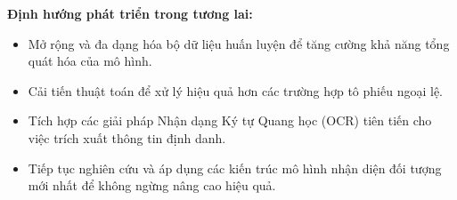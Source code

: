 \textbf{Định hướng phát triển trong tương lai:}
\begin{itemize}
    \item Mở rộng và đa dạng hóa bộ dữ liệu huấn luyện để tăng cường khả năng tổng quát hóa của mô hình.
    \item Cải tiến thuật toán để xử lý hiệu quả hơn các trường hợp tô phiếu ngoại lệ.
    \item Tích hợp các giải pháp Nhận dạng Ký tự Quang học (OCR) tiên tiến cho việc trích xuất thông tin định danh.

    \item Tiếp tục nghiên cứu và áp dụng các kiến trúc mô hình nhận diện đối tượng mới nhất để không ngừng nâng cao hiệu quả.
\end{itemize}

\medskip

